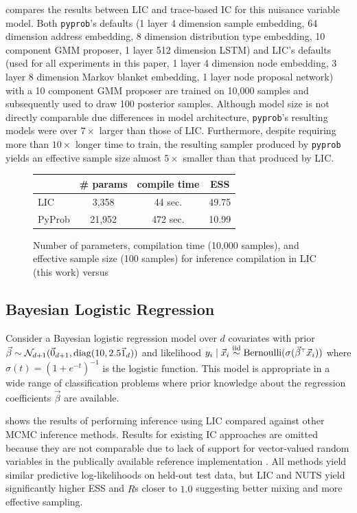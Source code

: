 \documentclass[twoside]{article}
\begin{document}
 compares the results between LIC and trace-based IC
\citep{le2017inference} for this nuisance variable model. Both \texttt{pyprob}'s
defaults (1 layer 4 dimension sample embedding, 64 dimension address
embedding, 8 dimension distribution type embedding, 10 component GMM
proposer, 1 layer 512 dimension LSTM) and LIC's defaults (used for all
experiments in this paper, 1 layer 4 dimension node embedding, 3 layer 8
dimension Markov blanket embedding, 1 layer node proposal network) with a 10
component GMM proposer are trained on 10,000 samples and subsequently used to
draw 100 posterior samples. Although model size is not directly comparable due
differences in model architecture, \texttt{pyprob}'s resulting models were over $7\times$
larger than those of LIC. Furthermore, despite requiring more than $10\times$ longer
time to train, the resulting sampler produced by \texttt{pyprob} yields
an effective sample size almost $5\times$ smaller than that produced by LIC.
\begin{figure}
  \centering
  \begin{tabular}{lccc}
    \toprule
           & \# params & compile time & ESS   \\
    \midrule
    LIC    & 3,358     & 44 sec.      & 49.75 \\
    PyProb & 21,952    & 472 sec.     & 10.99 \\
    \bottomrule
  \end{tabular}
  \caption{Number of parameters, compilation time (10,000 samples), and effective sample size (100 samples)
    for inference compilation in LIC (this work)
    versus \citep{pyprob2020}
  }\label{fig:nuisance}
\end{figure}

\subsection{Bayesian Logistic Regression}
\label{ssec:blr}

Consider a Bayesian logistic regression model over $d$ covariates
with prior
$\vec{\beta} \sim \mathcal{N}_{d+1}(\vec{0}_{d+1}, \operatorname{diag}(10, 2.5\vec{1}_{d}))$
and likelihood $y_i \mid \vx_i \simiid \text{Bernoulli}(\sigma(\vec{\beta}^\top \vx_i))$
where $\sigma(t) = (1 + e^{-t})^{-1}$ is the logistic function.
This model is appropriate in a wide range of classification problems where prior
knowledge about the regression coefficients $\vec{\beta}$ are available.

 shows the results of performing inference using LIC compared
against other MCMC inference methods. Results for existing IC approaches
\citep{le2017inference} are omitted because they are not comparable due to
lack of support for vector-valued random variables in the publically
available reference implementation \citep{pyprob2020}. All methods yield
similar predictive log-likelihoods on held-out test data, but LIC and NUTS
yield significantly higher ESS and $\widehat{R}$s closer to $1.0$ suggesting
better mixing and more effective sampling.
\end{document}
